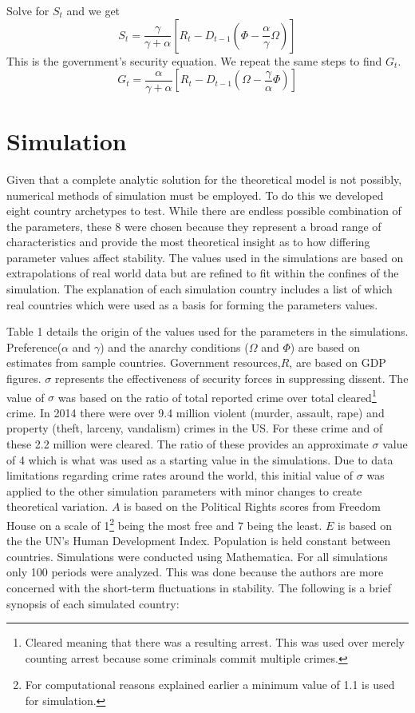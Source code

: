 \documentclass[12pt]{article}
\begin{document}
\begin{spacing}{1.5}
\noindent Solve for $S_t$ and we get
\begin{equation}
S_t=\frac{\gamma }{\gamma  +\alpha} \left[ R_t - D_{t-1} \left(\Phi - \frac{\alpha}{\gamma }\Omega \right) \right]
\end{equation}
\noindent This is the government's security equation. We repeat the same steps to find $G_t$. 
\begin{equation}
G_t=\frac{\alpha}{\gamma  +\alpha} \left[ R_t - D_{t-1} \left(\Omega - \frac{\gamma }{\alpha}\Phi \right) \right]
\end{equation}

\section{Simulation} 

Given that a complete analytic solution for the theoretical model is not possibly, numerical methods of simulation must be employed. To do this we developed eight country archetypes to test. While there are endless possible combination of the parameters, these 8 were chosen because they represent a broad range of characteristics and provide the most theoretical insight as to how differing parameter values affect stability. The values used in the simulations are based on extrapolations of real world data but are refined to fit within the confines of the simulation. The explanation of each simulation country includes a list of which real countries which were used as a basis for forming the parameters values. 

Table 1 details the origin of the values used for the parameters in the simulations. Preference($\alpha$ and $\gamma$) and the anarchy conditions ($\Omega$ and $\Phi$) are based on estimates from sample countries. Government resources,$R$, are based on GDP figures. $\sigma$ represents the effectiveness of security forces in suppressing dissent. The value of $\sigma$ was based on the ratio of total reported crime over total cleared\footnote{Cleared meaning that there was a resulting arrest. This was used over merely counting arrest because some criminals commit multiple crimes.} crime. In 2014 there were over 9.4 million violent (murder, assault, rape) and property (theft, larceny, vandalism) crimes in the US. For these crime and of these 2.2 million were cleared. The ratio of these provides an approximate $\sigma$ value of 4 which is what was used as a starting value in the simulations. Due to data limitations regarding crime rates around the world, this initial value of $\sigma$ was applied to the other simulation parameters with minor changes to create theoretical variation. $A$ is based on the Political Rights scores from Freedom House on a scale of 1\footnote{For computational reasons explained earlier a minimum value of 1.1 is used for simulation.} being the most free and 7 being the least. $E$ is based on the the UN's Human Development Index. Population is held constant between countries. Simulations were conducted using Mathematica. For all simulations only 100 periods were analyzed. This was done because the authors are more concerned with the short-term fluctuations in stability. The following is a brief synopsis of each simulated country:  


\end{spacing}
\end{document}
